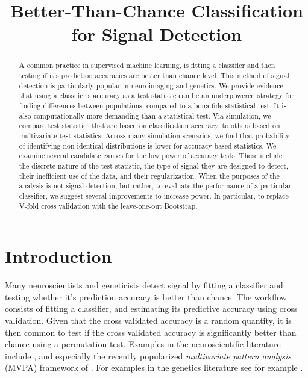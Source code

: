 \documentclass[12pt,a4paper]{article}
\title{Better-Than-Chance Classification for Signal Detection}
\begin{document}
\maketitle

\begin{abstract}
A common practice in supervised machine learning, is fitting a classifier and then testing if it's prediction accuracies are better than chance level.
This method of signal detection is particularly popular in neuroimaging and genetics.
We provide evidence that using a classifier's accuracy as a test statistic can be an underpowered strategy for finding differences between populations, compared to a bona-fide statistical test.
It is also computationally more demanding than a statistical test. 
Via simulation, we compare test statistics that are based on classification accuracy, to others based on multivariate test statistics. 
Across many simulation scenarios, we find that probability of identifying non-identical distributions is lower for accuracy based statistics.
We examine several candidate causes for the low power of accuracy tests. 
These include: the discrete nature of the test statistic, the type of signal they are designed to detect, their inefficient use of the data, and their regularization. 
When the purposes of the analysis is not signal detection, but rather, to evaluate the performance of a particular classifier, we suggest several improvements to increase power. 
In particular, to replace V-fold cross validation with the leave-one-out Bootstrap.
\end{abstract}


\section{Introduction}
\label{sec:introduction}

Many neuroscientists and geneticists detect signal by fitting a classifier and testing whether it's prediction accuracy is better than chance. 
The workflow consists of fitting a classifier, and estimating its predictive accuracy using cross validation. 
Given that the cross validated accuracy is a random quantity, it is then common to test if the cross validated accuracy is significantly better than chance using a permutation test.  
Examples in the neuroscientific literature include \citet{golland_permutation_2003,pereira_machine_2009,schreiber2013statistical,varoquaux_assessing_2016}, and especially the recently popularized \emph{multivariate pattern analysis} (MVPA) framework of \citet{kriegeskorte_information-based_2006}.
For examples in the genetics literature see for example
\citet{golub_molecular_1999,slonim_class_2000,radmacher_paradigm_2002,mukherjee_estimating_2003,juan_prediction_2004,jiang_calculating_2008}.
\end{document}
